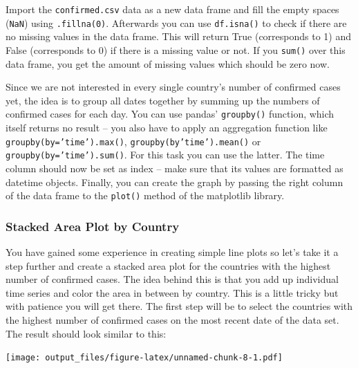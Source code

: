 \documentclass[
  11pt,
]{article}
\newenvironment{tipsp}[1]
  {
  \begin{itemize}
  \footnotesize
  \renewcommand{\labelitemi}{
    \raisebox{-.7\height}[0pt][0pt]{
      {\setkeys{Gin}{width=3em,keepaspectratio}
        \texttt{[image: images/\#1.png]}}
    }
  }
  \setlength{\fboxsep}{1em}
  \begin{pbox}
  \item
  }
  {
  \end{pbox}
  \end{itemize}
  }
\begin{document}
\begin{tipsp}p

Import the \texttt{confirmed.csv} data as a new data frame and fill the empty spaces (\texttt{NaN}) using \texttt{.fillna(0)}. Afterwards you can use \texttt{df.isna()} to check if there are no missing values in the data frame. This will return True (corresponds to 1) and False (corresponds to 0) if there is a missing value or not. If you \texttt{sum()} over this data frame, you get the amount of missing values which should be zero now.

Since we are not interested in every single country's number of confirmed cases yet, the idea is to group all dates together by summing up the numbers of confirmed cases for each day. You can use pandas' \texttt{groupby()} function, which itself returns no result -- you also have to apply an aggregation function like \texttt{groupby(by=’time’).max()}, \texttt{groupby(by’time’).mean()} or \texttt{groupby(by=’time’).sum()}. For this task you can use the latter.
The time column should now be set as index -- make sure that its values are formatted as datetime objects.
Finally, you can create the graph by passing the right column of the data frame to the \texttt{plot()} method of the matplotlib library.

\end{tipsp}

\hypertarget{stacked-area-plot-by-country}{%
\subsubsection{Stacked Area Plot by Country}\label{stacked-area-plot-by-country}}

You have gained some experience in creating simple line plots so let's take it a step further and create a stacked area plot for the countries with the highest number of confirmed cases. The idea behind this is that you add up individual time series and color the area in between by country. This is a little tricky but with patience you will get there. The first step will be to select the countries with the highest number of confirmed cases on the most recent date of the data set. The result should look similar to this:

\texttt{[image: output\_files/figure-latex/unnamed-chunk-8-1.pdf]}
\end{document}
